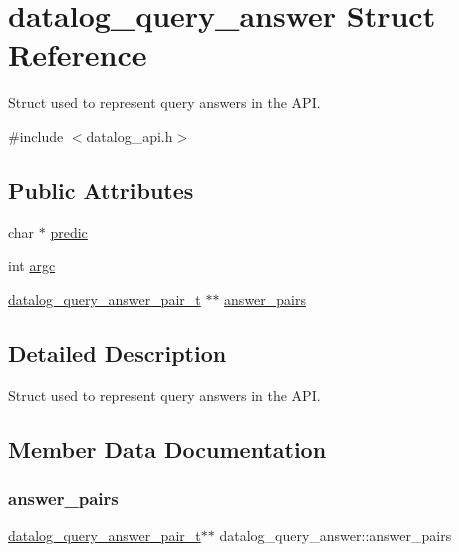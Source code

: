 \hypertarget{structdatalog__query__answer}{}\section{datalog\+\_\+query\+\_\+answer Struct Reference}
\label{structdatalog__query__answer}


Struct used to represent query answers in the A\+PI.  




{\ttfamily \#include $<$datalog\+\_\+api.\+h$>$}

\subsection*{Public Attributes}
\begin{DoxyCompactItemize}
\item 
char $\ast$ \hyperlink{structdatalog__query__answer_a721776aabf590192c96df972333d38d4}{predic}
\item 
int \hyperlink{structdatalog__query__answer_a29951460bcc8f936f7f349c851ba3819}{argc}
\item 
\hyperlink{datalog__api_8h_a734a9da1b36a22c0f4477a4bbceddb91}{datalog\+\_\+query\+\_\+answer\+\_\+pair\+\_\+t} $\ast$$\ast$ \hyperlink{structdatalog__query__answer_a65100b17d9f772d15161d810e6a43aa6}{answer\+\_\+pairs}
\end{DoxyCompactItemize}


\subsection{Detailed Description}
Struct used to represent query answers in the A\+PI. 

\subsection{Member Data Documentation}
\mbox{\label{structdatalog__query__answer_a65100b17d9f772d15161d810e6a43aa6}} 
\subsubsection{\texorpdfstring{answer\+\_\+pairs}{answer\_pairs}}
{\footnotesize\ttfamily \hyperlink{datalog__api_8h_a734a9da1b36a22c0f4477a4bbceddb91}{datalog\+\_\+query\+\_\+answer\+\_\+pair\+\_\+t}$\ast$$\ast$ datalog\+\_\+query\+\_\+answer\+::answer\+\_\+pairs}

